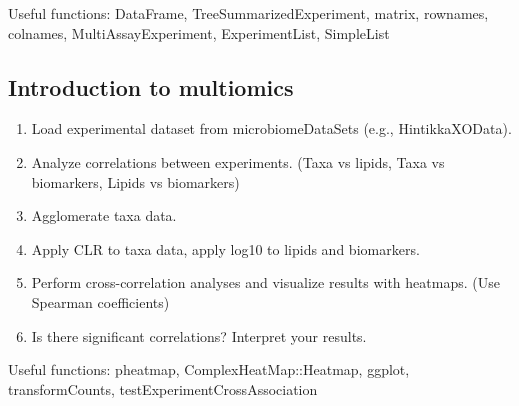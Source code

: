 \documentclass[
]{book}
\providecommand{\tightlist}{%
  \setlength{\itemsep}{0pt}\setlength{\parskip}{0pt}}
\begin{document}
Useful functions: DataFrame, TreeSummarizedExperiment, matrix, rownames, colnames, MultiAssayExperiment, ExperimentList, SimpleList

\hypertarget{introduction-to-multiomics}{%
\subsection{Introduction to multiomics}\label{introduction-to-multiomics}}

\begin{enumerate}
\def\labelenumi{\arabic{enumi}.}
\tightlist
\item
  Load experimental dataset from microbiomeDataSets (e.g., HintikkaXOData).
\item
  Analyze correlations between experiments. (Taxa vs lipids, Taxa vs biomarkers, Lipids vs biomarkers)
\item
  Agglomerate taxa data.
\item
  Apply CLR to taxa data, apply log10 to lipids and biomarkers.
\item
  Perform cross-correlation analyses and visualize results with heatmaps. (Use Spearman coefficients)
\item
  Is there significant correlations? Interpret your results.
\end{enumerate}

Useful functions: pheatmap, ComplexHeatMap::Heatmap, ggplot, transformCounts, testExperimentCrossAssociation

  
\end{document}
